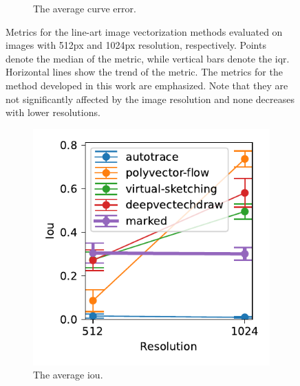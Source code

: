 \begin{figure}[h]
\begin{subfigure}{.3\textwidth}
    \caption{The average curve error.}
\end{subfigure}
    \caption{Metrics for the line-art image vectorization methods evaluated on images with 512px and 1024px resolution, respectively. Points denote the median of the metric, while vertical bars denote the \gls{iqr}. Horizontal lines show the trend of the metric. The metrics for the method developed in this work are emphasized. Note that they are not significantly affected by the image resolution and none decreases with lower resolutions.}
    \label{fig:res_comparison}
\end{figure}

\begin{figure}[!h]
    \centering
    \begin{subfigure}{.3\textwidth}
    \centering
    \includegraphics[width=\textwidth]{graphics/eval/iou_res_sketchbench.pdf}
    \caption{The average \gls{iou}.}
    \label{fig:iou_res_sketchbench}
\end{subfigure}
    \begin{subfigure}{.3\textwidth}
    \centering

\end{subfigure}
\end{figure}
